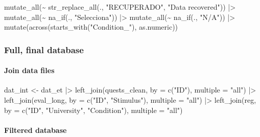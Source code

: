 \documentclass[
  bookmarksnumbered]{article}
\newenvironment{Shaded}{\begin{snugshade}}{\end{snugshade}}
\newcommand{\AttributeTok}[1]{\textcolor[rgb]{0.80,0.80,0.80}{#1}}
\newcommand{\FunctionTok}[1]{\textcolor[rgb]{0.94,0.94,0.56}{#1}}
\newcommand{\NormalTok}[1]{\textcolor[rgb]{0.80,0.80,0.80}{#1}}
\newcommand{\OtherTok}[1]{\textcolor[rgb]{0.94,0.94,0.56}{#1}}
\newcommand{\SpecialCharTok}[1]{\textcolor[rgb]{0.86,0.64,0.64}{#1}}
\newcommand{\StringTok}[1]{\textcolor[rgb]{0.80,0.58,0.58}{#1}}
\begin{document}
\begin{Shaded}
\begin{Highlighting}[]
  \FunctionTok{mutate\_all}\NormalTok{(}\SpecialCharTok{\textasciitilde{}} \FunctionTok{str\_replace\_all}\NormalTok{(., }\StringTok{"RECUPERADO"}\NormalTok{, }\StringTok{"Data recovered"}\NormalTok{)) }\SpecialCharTok{|\textgreater{}}
  \FunctionTok{mutate\_all}\NormalTok{(}\SpecialCharTok{\textasciitilde{}} \FunctionTok{na\_if}\NormalTok{(., }\StringTok{"Selecciona"}\NormalTok{)) }\SpecialCharTok{|\textgreater{}}
  \FunctionTok{mutate\_all}\NormalTok{(}\SpecialCharTok{\textasciitilde{}} \FunctionTok{na\_if}\NormalTok{(., }\StringTok{"N/A"}\NormalTok{)) }\SpecialCharTok{|\textgreater{}}
  \FunctionTok{mutate}\NormalTok{(}\FunctionTok{across}\NormalTok{(}\FunctionTok{starts\_with}\NormalTok{(}\StringTok{"Condition\_"}\NormalTok{), as.numeric))}
\end{Highlighting}
\end{Shaded}

\subsubsection{Full, final database}\label{full-final-database}

\paragraph{Join data files}\label{join-data-files}

\begin{Shaded}
\begin{Highlighting}[]
\NormalTok{dat\_int }\OtherTok{\textless{}{-}}\NormalTok{ dat\_et }\SpecialCharTok{|\textgreater{}}
  \FunctionTok{left\_join}\NormalTok{(quests\_clean, }\AttributeTok{by =} \FunctionTok{c}\NormalTok{(}\StringTok{"ID"}\NormalTok{), }\AttributeTok{multiple =} \StringTok{"all"}\NormalTok{) }\SpecialCharTok{|\textgreater{}}
  \FunctionTok{left\_join}\NormalTok{(eval\_long, }\AttributeTok{by =} \FunctionTok{c}\NormalTok{(}\StringTok{"ID"}\NormalTok{, }\StringTok{"Stimulus"}\NormalTok{), }\AttributeTok{multiple =} \StringTok{"all"}\NormalTok{) }\SpecialCharTok{|\textgreater{}}
  \FunctionTok{left\_join}\NormalTok{(reg, }\AttributeTok{by =} \FunctionTok{c}\NormalTok{(}\StringTok{"ID"}\NormalTok{, }\StringTok{"University"}\NormalTok{, }\StringTok{"Condition"}\NormalTok{), }\AttributeTok{multiple =} \StringTok{"all"}\NormalTok{)}
\end{Highlighting}
\end{Shaded}

\paragraph{Filtered database}\label{filtered-database}
\end{document}
